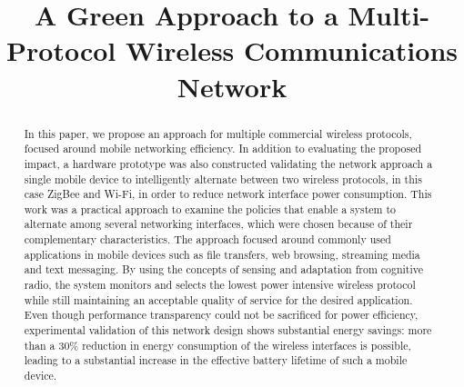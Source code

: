 \documentclass[conference]{IEEEtran}
\begin{document}
\title{A Green Approach to a Multi-Protocol Wireless Communications Network}


\author{
}


\maketitle


\begin{abstract}
In this paper, we propose an approach for multiple commercial wireless protocols, focused around mobile networking efficiency.  In addition to evaluating the proposed impact, a hardware prototype was also constructed validating the network approach a single mobile device to intelligently alternate between two wireless protocols, in this case ZigBee and Wi-Fi, in order to reduce network interface power consumption.   This work was a practical approach to examine the policies that enable a system to alternate among several networking interfaces, which were chosen because of their complementary characteristics.  The approach focused around commonly used applications in mobile devices such as file transfers, web browsing, streaming media and text messaging.  By using the concepts of sensing and adaptation from cognitive radio, the system monitors and selects the lowest power intensive wireless protocol while still maintaining an acceptable quality of service for the desired application.  Even though performance transparency could not be sacrificed for power efficiency, experimental validation of this network design shows substantial energy savings: more than a 30\% reduction in energy consumption of the wireless interfaces is possible, leading to a substantial increase in the effective battery lifetime of such a mobile device.
\end{abstract}
\end{document}
